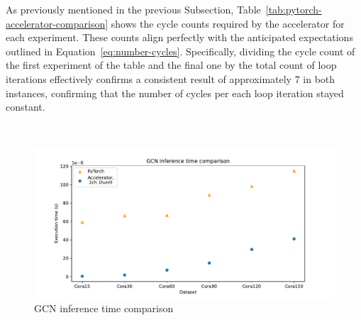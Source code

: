 As previously mentioned in the previous Subsection, Table~\ref{tab:pytorch-accelerator-comparison} shows the cycle counts required by the accelerator for each experiment.
These counts align perfectly with the anticipated expectations outlined in Equation~\ref{eq:number-cycles}.
Specifically, dividing the cycle count of the first experiment of the table and the final one by the total count of loop iterations effectively confirms a consistent result of approximately 7 in both instances, confirming that the number of cycles per each loop iteration stayed constant.

\begin{table}[t]
\centering
    \\[10pt]
    \caption{GCN inference time comparison}
    \label{tab:GCN-inference-pytorch-accelerator-comparison}
\end{table}

\begin{figure}[t!]
    \centering
    \includegraphics[height=0.4\textwidth]{Images/gcn_forward_comparison}
    \caption{GCN inference time comparison}
    \label{fig:gcn-inference-comparison}
\end{figure}

